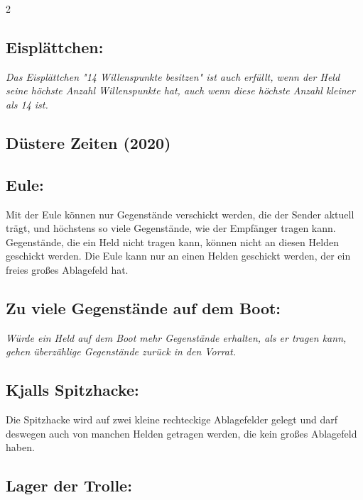 \documentclass[10pt, a4paper, oneside]{book}
\newcommand{\fan}[1]{\textit{#1}}
\begin{document}
\begin{multicols*}{2}
\begin{bgcolor}[color-AG]
\subsection{Eisplättchen:}

\fan{Das Eisplättchen "14 Willenspunkte besitzen" ist auch erfüllt, wenn der Held seine höchste Anzahl Willenspunkte hat, auch wenn diese höchste Anzahl kleiner als 14 ist.}

\end{bgcolor}





\begin{bgcolor}[color-DZ]
\section{Düstere Zeiten (2020)}

\subsection{Eule:}


Mit der Eule können nur Gegenstände verschickt werden, die der Sender aktuell trägt, und höchstens so viele Gegenstände, wie der Empfänger tragen kann. Gegenstände, die ein Held nicht tragen kann, können nicht an diesen Helden geschickt werden. Die Eule kann nur an einen Helden geschickt werden, der ein freies großes Ablagefeld hat.
\supercite{DZ:Begleitheft}


\subsection{Zu viele Gegenstände auf dem Boot:}

\fan{Würde ein Held auf dem Boot mehr Gegenstände erhalten, als er tragen kann, gehen überzählige Gegenstände zurück in den Vorrat.}


\subsection{Kjalls Spitzhacke:}

Die Spitzhacke wird auf zwei kleine rechteckige Ablagefelder gelegt und darf deswegen auch von manchen Helden getragen werden, die kein großes Ablagefeld haben.


\subsection{Lager der Trolle:}


\end{bgcolor}
\end{multicols*}
\end{document}
